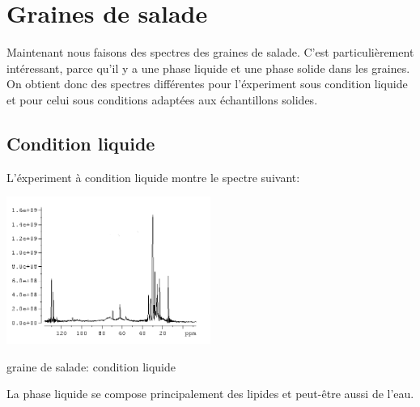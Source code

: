\documentclass[a4paper,12pt]{scrartcl}
\begin{document}
 \section{Graines de salade}
Maintenant nous faisons des spectres des graines de salade. C'est particulièrement	 intéressant, parce qu'il y a une phase liquide et une phase solide dans les graines. On obtient donc des spectres différentes pour l'éxperiment sous condition liquide et pour celui sous conditions adaptées aux échantillons solides.  
  \subsection{Condition liquide}
L'éxperiment à condition liquide montre le spectre suivant: 
 \begin{figurehere}
    \center
    \includegraphics[width=0.5\textwidth]{bilder/graine_liquide.png}
    \caption{graine de salade: condition liquide}
   \end{figurehere}
La phase liquide se compose principalement des lipides et peut-être aussi de l'eau. 
\end{document}
